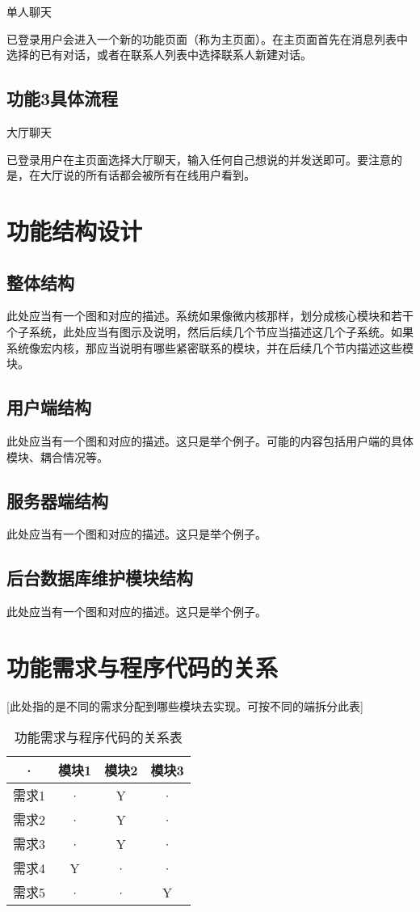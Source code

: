 单人聊天

已登录用户会进入一个新的功能页面（称为主页面）。在主页面首先在消息列表中选择的已有对话，或者在联系人列表中选择联系人新建对话。

\subsection{功能3具体流程}

大厅聊天

已登录用户在主页面选择大厅聊天，输入任何自己想说的并发送即可。要注意的是，在大厅说的所有话都会被所有在线用户看到。



\section{功能结构设计}
\subsection{整体结构}
此处应当有一个图和对应的描述。系统如果像微内核那样，划分成核心模块和若干个子系统，此处应当有图示及说明，然后后续几个节应当描述这几个子系统。如果系统像宏内核，那应当说明有哪些紧密联系的模块，并在后续几个节内描述这些模块。

\subsection{用户端结构}
此处应当有一个图和对应的描述。这只是举个例子。可能的内容包括用户端的具体模块、耦合情况等。

\subsection{服务器端结构}
此处应当有一个图和对应的描述。这只是举个例子。

\subsection{后台数据库维护模块结构}
此处应当有一个图和对应的描述。这只是举个例子。



\section{功能需求与程序代码的关系}
[此处指的是不同的需求分配到哪些模块去实现。可按不同的端拆分此表]
\begin{table}[htbp]
\centering
\caption{功能需求与程序代码的关系表} \label{tab:requirement-module}
\begin{tabular}{|c|c|c|c|}
    \hline
    · & 模块1 & 模块2 & 模块3 \\
    \hline
    需求1 & · & Y & · \\
    \hline
    需求2 & · & Y & · \\
    \hline
    需求3 & · & Y & · \\
    \hline
    需求4 & Y & · & · \\
    \hline
    需求5 & · & · & Y \\
    \hline
\end{tabular}
\end{table}